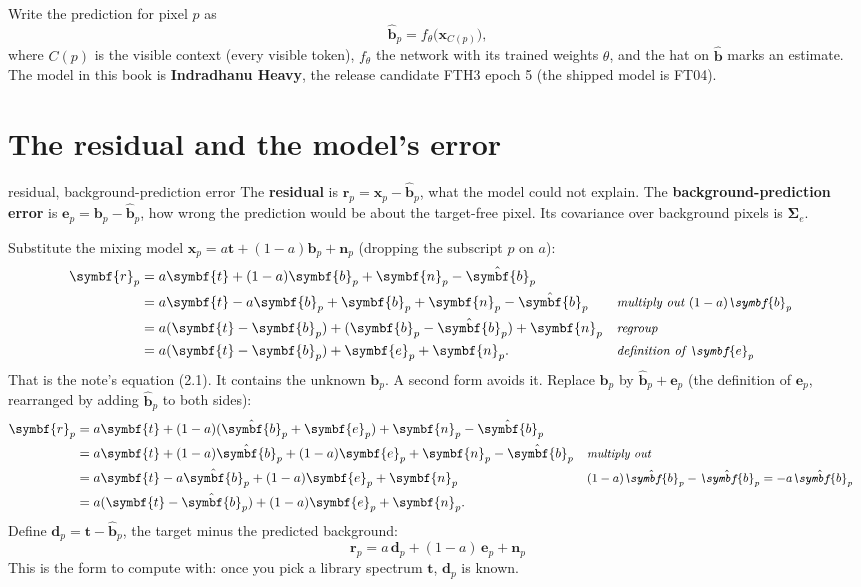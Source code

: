 \documentclass[11pt,a4paper,oneside,openany]{book}
\newcommand{\B}[1]{{\symbf{#1}}}
\newcommand{\B}[1]{{\bm{#1}}}
\newcommand{\vx}{\B{x}}
\newcommand{\vt}{\B{t}}
\newcommand{\vb}{\B{b}}
\newcommand{\vbh}{\hat{\B{b}}}
\newcommand{\vr}{\B{r}}
\newcommand{\ve}{\B{e}}
\newcommand{\vn}{\B{n}}
\newcommand{\vd}{\B{d}}
\newcommand{\mSig}{\B{\Sigma}}
\newcommand{\why}[1]{&&\text{\small\itshape #1}}
\begin{document}
Write the prediction for pixel $p$ as
\[
  \vbh_p=f_\theta\big(\vx_{C(p)}\big),
\]
where $C(p)$ is the visible context (every visible token), $f_\theta$ the network with its trained weights $\theta$, and the hat on
$\vbh$ marks an estimate. The model in this book is \textbf{Indradhanu Heavy}, the release candidate FTH3 epoch 5 (the shipped model is
FT04).

\section{The residual and the model's error}

\begin{defn}{residual, background-prediction error}
The \textbf{residual} is $\vr_p=\vx_p-\vbh_p$, what the model could not explain. The \textbf{background-prediction error} is
$\ve_p=\vb_p-\vbh_p$, how wrong the prediction would be about the target-free pixel. Its covariance over background pixels is
$\mSig_e$.
\end{defn}

Substitute the mixing model $\vx_p=a\vt+(1-a)\vb_p+\vn_p$ (dropping the subscript $p$ on $a$):
\begin{align*}
\vr_p &= a\vt+(1-a)\vb_p+\vn_p-\vbh_p\\
 &= a\vt-a\vb_p+\vb_p+\vn_p-\vbh_p \why{multiply out $(1-a)\vb_p$}\\
 &= a(\vt-\vb_p)+(\vb_p-\vbh_p)+\vn_p \why{regroup}\\
 &= a(\vt-\vb_p)+\ve_p+\vn_p . \why{definition of $\ve_p$}
\end{align*}
That is the note's equation (2.1). It contains the unknown $\vb_p$. A second form avoids it. Replace $\vb_p$ by $\vbh_p+\ve_p$ (the
definition of $\ve_p$, rearranged by adding $\vbh_p$ to both sides):
\begin{align*}
\vr_p &= a\vt+(1-a)(\vbh_p+\ve_p)+\vn_p-\vbh_p\\
 &= a\vt+(1-a)\vbh_p+(1-a)\ve_p+\vn_p-\vbh_p \why{multiply out}\\
 &= a\vt-a\vbh_p+(1-a)\ve_p+\vn_p \why{$(1-a)\vbh_p-\vbh_p=-a\vbh_p$}\\
 &= a(\vt-\vbh_p)+(1-a)\ve_p+\vn_p .
\end{align*}
Define $\vd_p=\vt-\vbh_p$, the target minus the predicted background:
\[
  \boxed{\ \vr_p=a\,\vd_p+(1-a)\,\ve_p+\vn_p\ }
\]
This is the form to compute with: once you pick a library spectrum $\vt$, $\vd_p$ is known.
\end{document}
